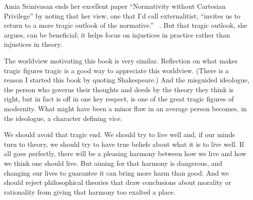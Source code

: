 Amia Srinivasan ends her excellent paper ``Normativity without Cartesian Privilege'' by noting that her view, one that I'd call externalitist, ``invites us to return to a more tragic outlook of the normative.'' ~\citep[287]{Srinivasan2015}. But that tragic outlook, she argues, can be beneficial; it helps focus on injustices in practice rather than injustices in theory.

The worldview motivating this book is very similar. Reflection on what makes tragic figures tragic is a good way to appreciate this worldview. (There is a reason I started this book by quoting Shakespeare.) And the misguided ideologue, the person who governs their thoughts and deeds by the theory they think is right, but in fact is off in one key respect, is one of the great tragic figures of modernity. What might have been a minor flaw in an average person becomes, in the ideologue, a character defining vice.

We should avoid that tragic end. We should try to live well and, if our minds turn to theory, we should try to have true beliefs about what it is to live well. If all goes perfectly, there will be a pleasing harmony between how we live and how we think one should live. But aiming for that harmony is dangerous, and changing our lives to guarantee it can bring more harm than good. And we should reject philosophical theories that draw conclusions about morality or rationality from giving that harmony too exalted a place.




